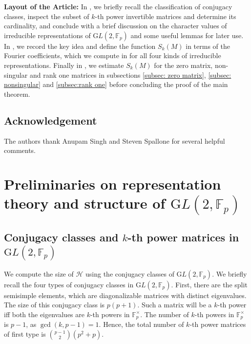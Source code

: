 \documentclass[12pt,reqno]{amsart}
\theoremstyle{plain}
\theoremstyle{definition}
\newcommand{\GL}{{\mathrm GL}}
\newcommand{\sH}{{\mathcal H}}
\theoremstyle{remark}
\newcommand{\FF}{\mathbb{F}}
\begin{document}
\textbf{Layout of the Article:} In , we briefly recall the classification of conjugacy classes, inspect the subset of $k$-th power invertible matrices and determine its cardinality, and conclude with a brief discussion on the character values of irreducible representations of $\GL(2,\FF_p)$ and some useful lemmas for later use. In , we record the key idea and define the function $S_k(M)$ in terms of the Fourier coefficients, which we compute in  for all four kinds of irreducible representations. Finally in , we estimate $S_k(M)$ for the zero matrix, non-singular and rank one matrices in subsections \ref{subsec: zero matrix}, \ref{subsec: nonsingular} and \ref{subsec:rank one} before concluding the proof of the main theorem.

\subsection*{Acknowledgement} The authors thank Anupam Singh and Steven Spallone for several helpful comments.  

\section{Preliminaries on representation theory and structure of $\GL(2,\FF_p)$}\label{sec: prelim}
\subsection{Conjugacy classes and $k$-th power matrices in $\GL(2, \FF_p)$}
We compute the size of $\sH$ using the conjugacy classes of $\GL(2, \FF_p)$. We briefly recall the four types of conjugacy classes in $\GL(2, \FF_p)$. First, there are the split semisimple elements, which are diagonalizable matrices with distinct eigenvalues. The size of this conjugacy class is $p(p+1).$ Such a matrix will be a $k$-th power iff both the eigenvalues are $k$-th powers in $\FF_p^{\times}$. The number of $k$-th powers in $\FF_p^{\times}$ is $p-1$, as $\gcd(k, p-1)=1.$ Hence, the total number of $k$-th power matrices of first type is $\binom{p-1}{2} (p^2+p).$
 
\end{document}
